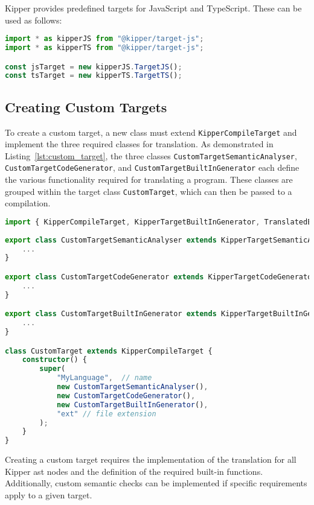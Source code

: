 Kipper provides predefined targets for JavaScript and TypeScript. These can be used as follows:

\begin{lstlisting}[language=Typescript, caption=Using Compilation Targets, label=lst:using_targets]
import * as kipperJS from "@kipper/target-js";
import * as kipperTS from "@kipper/target-js";

const jsTarget = new kipperJS.TargetJS();
const tsTarget = new kipperTS.TargetTS();
\end{lstlisting}

\subsection{Creating Custom Targets}
\label{subsec:custom_targets}

To create a custom target, a new class must extend \lstinline|KipperCompileTarget| and implement the three required classes for translation. As demonstrated in Listing~\ref{lst:custom_target}, the three classes \lstinline|CustomTargetSemanticAnalyser|, \lstinline|CustomTargetCodeGenerator|, and \lstinline|CustomTargetBuiltInGenerator| each define the various functionality required for translating a program. These classes are grouped within the target class \lstinline|CustomTarget|, which can then be passed to a compilation.

\begin{lstlisting}[language=Typescript, caption=Creating a Custom Compilation Target, label=lst:custom_target]
import { KipperCompileTarget, KipperTargetBuiltInGenerator, TranslatedExpression } from "@kipper/core";
	
export class CustomTargetSemanticAnalyser extends KipperTargetSemanticAnalyser {
	...
}

export class CustomTargetCodeGenerator extends KipperTargetCodeGenerator {
	...
}

export class CustomTargetBuiltInGenerator extends KipperTargetBuiltInGenerator {
	...
}

class CustomTarget extends KipperCompileTarget {
	constructor() {
		super(
			"MyLanguage",  // name
			new CustomTargetSemanticAnalyser(), 
			new CustomTargetCodeGenerator(), 
			new CustomTargetBuiltInGenerator(), 
			"ext" // file extension
		);
	}
}
\end{lstlisting}

Creating a custom target requires the implementation of the translation for all Kipper \acrshort{ast} nodes and the definition of the required built-in functions. Additionally, custom semantic checks can be implemented if specific requirements apply to a given target.

